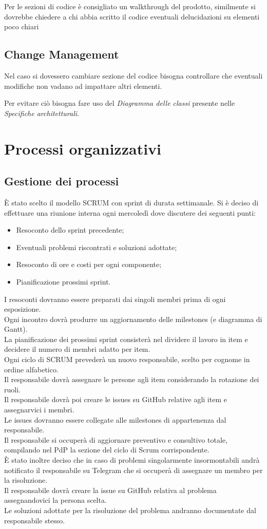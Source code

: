 \documentclass[a4paper, 12pt]{article}
\begin{document}
Per le sezioni di codice è consigliato un walkthrough del prodotto, similmente si dovrebbe chiedere a chi abbia scritto il codice eventuali delucidazioni su elementi poco chiari
\subsection{Change Management}
Nel caso si dovessero cambiare sezione del codice bisogna controllare che eventuali modifiche non vadano ad impattare altri elementi. 

Per evitare ciò bisogna fare uso del \textit{Diagramma delle classi} presente nelle \textit{Specifiche architetturali}.
\section{Processi organizzativi}
\subsection{Gestione dei processi}
È stato scelto il modello SCRUM con sprint di durata settimanale.
Si è deciso di effettuare una riunione interna ogni mercoledì dove discutere dei seguenti punti:
\begin{itemize}
\item Resoconto dello sprint precedente;
\item Eventuali problemi riscontrati e soluzioni adottate;
\item Resoconto di ore e costi per ogni componente;
\item Pianificazione prossimi sprint.
\end{itemize}
I resoconti dovranno essere preparati dai singoli membri prima di ogni esposizione.\\
Ogni incontro dovrà produrre un aggiornamento delle milestones (e diagramma di Gantt).\\
La pianificazione dei prossimi sprint consisterà nel dividere il lavoro in item e decidere il numero di membri adatto per item.\\
Ogni ciclo di SCRUM prevederà un nuovo responsabile, scelto per cognome in ordine alfabetico.\\
Il responsabile dovrà assegnare le persone agli item considerando la rotazione dei ruoli.\\
Il responsabile dovrà poi creare le issues su GitHub relative agli item e assegnarvici i membri.\\
Le issues dovranno essere collegate alle milestones di appartenenza dal responsabile.\\
Il responsabile si occuperà di aggiornare preventivo e consultivo totale, compilando nel PdP la sezione del ciclo di Scrum corrispondente.\\
È stato inoltre deciso che in caso di problemi singolarmente insormontabili andrà notificato il responsabile su Telegram che si occuperà di assegnare
un membro per la risoluzione.\\
Il responsabile dovrà creare la issue su GitHub relativa al problema assegnandovici la persona scelta.\\
Le soluzioni adottate per la risoluzione del problema andranno documentate dal responsabile stesso.\\
\end{document}
